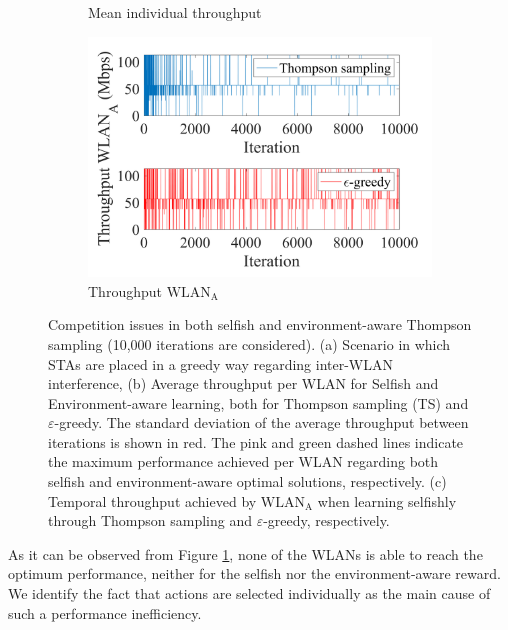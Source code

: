 \documentclass[preprint,12pt]{elsarticle}
\begin{document}
\begin{figure}[h!!!!]
\begin{subfigure}[b]{0.48\textwidth}
		\caption{Mean individual throughput}
		\label{fig:4_grid_selfish_adversarial_mean_tpt}
	\end{subfigure}
	\begin{subfigure}[b]{0.36\textwidth}
		\includegraphics[width=\textwidth]{experiment_2_3_variability}
		\caption{Throughput $\text{WLAN}_\text{A}$}
		\label{fig:experiment_2_3_variability}
	\end{subfigure}
	\caption{Competition issues in both selfish and environment-aware Thompson sampling (10,000 iterations are considered). (a) Scenario in which STAs are placed in a greedy way regarding inter-WLAN interference, (b) Average throughput per WLAN for Selfish and Environment-aware learning, both for Thompson sampling (TS) and $\varepsilon$-greedy. The standard deviation of the average throughput between iterations is shown in red. The pink and green dashed lines indicate the maximum performance achieved per WLAN regarding both selfish and environment-aware optimal solutions, respectively. (c) Temporal throughput achieved by $\text{WLAN}_\text{A}$ when learning selfishly through Thompson sampling and $\varepsilon$-greedy, respectively.}
	\label{fig:4_grid_selfish_adversarial}
\end{figure}

As it can be observed from Figure \ref{fig:4_grid_selfish_adversarial_mean_tpt}, none of the WLANs is able to reach the optimum performance, neither for the selfish nor the environment-aware reward. We identify the fact that actions are selected individually as the main cause of such a performance inefficiency. 
\end{document}
